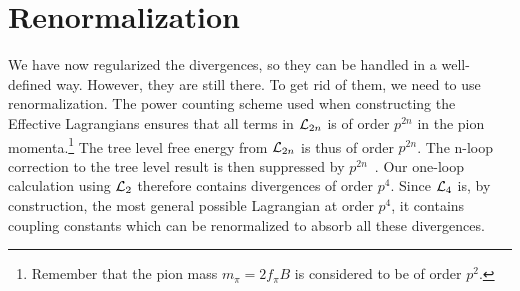 \section{Renormalization}
We have now regularized the divergences, so they can be handled in a well-defined way.
However, they are still there.
To get rid of them, we need to use renormalization.
The power counting scheme used when constructing the Effective Lagrangians ensures that all terms in $\mathcal{L}_{2n}$ is of order $p^{2n}$ in the pion momenta.\footnote{Remember that the pion mass $m_\pi = 2 f_\pi B$ is considered to be of order $p^2$.}
The tree level free energy from $\mathcal{L}_{2n}$ is thus of order $p^{2n}$.
The n-loop correction to the tree level result is then suppressed by $p^{2n}$~\cite{Gasser-Leutwyler:chiral,WeinbergPhenom}.
Our one-loop calculation using $\mathcal{L}_2$ therefore contains divergences of order $p^{4}$. 
Since $\mathcal{L}_4$ is, by construction, the most general possible Lagrangian at order $p^4$, it contains coupling constants which can be renormalized to absorb all these divergences.

